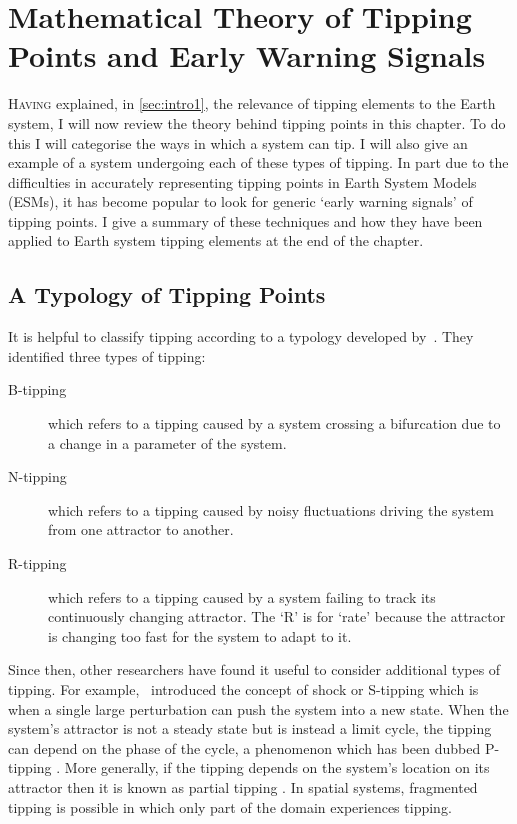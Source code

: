 \chapter{Mathematical Theory of Tipping Points and Early Warning Signals}
\label{sec:intro2}
\graphicspath{{introduction2/figs}}

\lettrine[lines=3,loversize=0.1,findent=0.1em,nindent=0em]{H}{aving} explained, in \cref{sec:intro1}, the relevance of tipping elements to the Earth system, I will now review
the theory behind tipping points in this chapter. To do this I will categorise the ways in which a system can tip. I will also give an example of a system undergoing 
each of these types of tipping. In part due to the difficulties in accurately representing tipping points in Earth System Models (ESMs), it has become popular to
look for generic `early warning signals' of tipping points. I give a summary of these techniques and how they have been applied to Earth system tipping elements
at the end of the chapter.


\section{A Typology of Tipping Points}
\label{sec:tipping_typology}
It is helpful to classify tipping according to a typology developed by~\cite{Ashwin2012}. They identified three types of tipping:
\begin{description}
\item[B-tipping] which refers to a tipping caused by a system crossing a bifurcation due to a change in a parameter of the system.
\item[N-tipping] which refers to a tipping caused by noisy fluctuations driving the system  from one attractor to another.
\item[R-tipping] which  refers to a tipping caused by a system failing to track its continuously changing attractor. The `R' is for `rate' because the attractor is changing too
  fast for the system to adapt to it.
\end{description}

Since then, other researchers have found it useful to consider additional types of tipping. For example,~\cite{Halekotte2020} introduced the concept of shock or S-tipping which is
when a single large perturbation can push the system into a new state. When the system's attractor is not a steady state but is instead a limit cycle, the tipping can depend on the
phase of the cycle, a phenomenon which has been dubbed P-tipping \parencite{Alkhayuon2021}. More generally, if the tipping depends on the system's location on its attractor
then it is known as partial tipping \parencite{Alkhayuon2018}. In spatial systems, fragmented tipping is possible \parencite{Bastiaansen2022} in which only part of the domain
experiences tipping.

